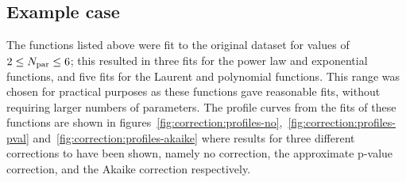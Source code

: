 \subsection{Example case}
\label{sec:correction:example}

The functions listed above were fit to the original dataset for values of
$2 \le N_{\rm par} \le 6$; this resulted in three fits for the power law and
exponential functions, and five fits for the Laurent and polynomial functions.
This range was chosen for practical purposes as these functions gave reasonable
fits, without requiring larger numbers of parameters.
The profile curves from the fits of these functions are shown in
figures~\ref{fig:correction:profiles-no},~\ref{fig:correction:profiles-pval} and~\ref{fig:correction:profiles-akaike} where results for three different
corrections to \nll have been shown, namely no correction, the approximate
p-value correction, and the Akaike correction respectively.

